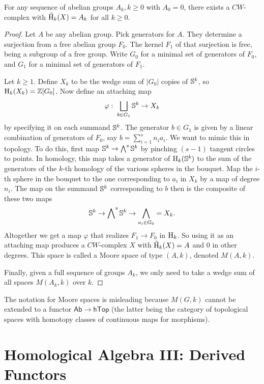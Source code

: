 \begin{prop}
    For any sequence of abelian groups $A_k,k\geq 0$ with $A_0=0$, there exists a $CW$-complex with $\wt{\rmH}_k(X)=A_k$ for all $k\geq 0$.
\end{prop}
\begin{proof}
    Let $A$ be any abelian group. Pick generators for $A$. They determine a surjection from a free abelian group $F_0$. The kernel $F_1$ of that surjection is free, being a subgroup of a free group. Write $G_0$ for a minimal set of generators of $F_0$, and $G_1$ for a minimal set of generators of $F_1$.

    Let $k\geq 1$. Define $X_k$ to be the wedge sum of $|G_0|$ copies of $\mathbb{S}^k$, so $\mathrm{H}_k(X_k)=\mathbb{Z}[G_0]$. Now define an attaching map
    \[\varphi:\;\bigsqcup_{b\in G_1}\mathbb{S}^k\to X_k\]
    by specifying it on each summand $\mathbb{S}^k$. The generator $b\in G_1$ is given by a linear combination of generators of $F_0$, say $b=\sum_{i=1}^s n_i a_i$. We want to mimic this in topology. To do this, first map $\mathbb{S}^k\to \bigwedge\nolimits^s \mathbb{S}^k$ by pinching $(s-1)$ tangent circles to points. In homology, this map takes a generator of $\mathrm{H}_k(\mathbb{S}^k)$ to the sum of the generators of the $k$-th homology of the various spheres in the bouquet. Map the $i$-th sphere in the bouquet to the one corresponding to $a_i$ in $X_k$ by a map of degree $n_i$. The map on the summand $\mathbb{S}^k$ corresponding to $b$ then is the composite of these two maps
    \[\mathbb{S}^k\to \bigwedge\nolimits^s \mathbb{S}^k\to \bigwedge_{a_i\in G_0}=X_k.\]
    Altogether we get a map $\varphi$ that realizes $F_1\to F_0$ in $\mathrm{H}_k$. So using it as an attaching map produces a $CW$-complex $X$ with $\wt{\rmH}_k(X)=A$ and $0$ in other degrees. This space is called a Moore space of type $(A,k)$, denoted $M(A,k)$.

    Finally, given a full sequence of groups $A_k$, we only need to take a wedge sum of all spaces $M(A_k,k)$ over $k$.
\end{proof}

\begin{rem}
    The notation for Moore spaces is misleading because $M(G,k)$ cannot be extended to a functor $\mathsf{Ab}\to \mathsf{hTop}$ (the latter being the category of topological spaces with homotopy classes of continuous maps for morphisms).
\end{rem}




\clearpage
\chapter{Homological Algebra III: Derived Functors}

